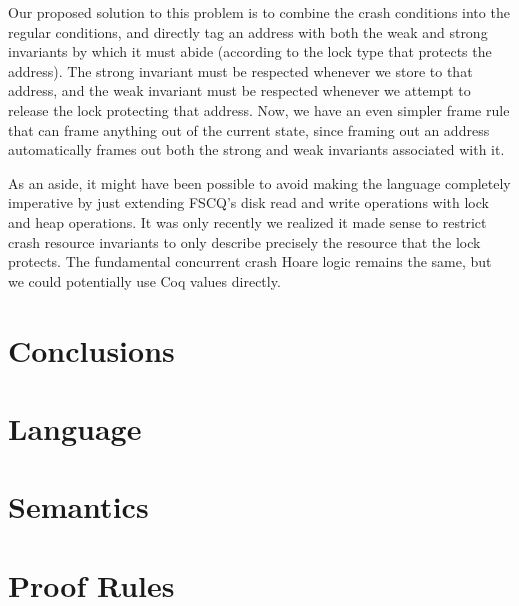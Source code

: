 Our proposed solution to this problem is to combine the crash conditions into
the regular conditions, and directly tag an address with both the weak and
strong invariants by which it must abide (according to the lock type that
protects the address). The strong invariant must be respected whenever we store
to that address, and the weak invariant must be respected whenever we attempt to
release the lock protecting that address. Now, we have an even simpler frame
rule that can frame anything out of the current state, since framing out an
address automatically frames out both the strong and weak invariants associated
with it.

As an aside, it might have been possible to avoid making the language completely
imperative by just extending FSCQ's disk read and write operations with lock and
heap operations. It was only recently we realized it made sense to restrict
crash resource invariants to only describe precisely the resource that the lock
protects. The fundamental concurrent crash Hoare logic remains the same, but we
could potentially use Coq values directly.

\section{Conclusions}

\appendix
\section{Language}
\section{Semantics}
\section{Proof Rules}

